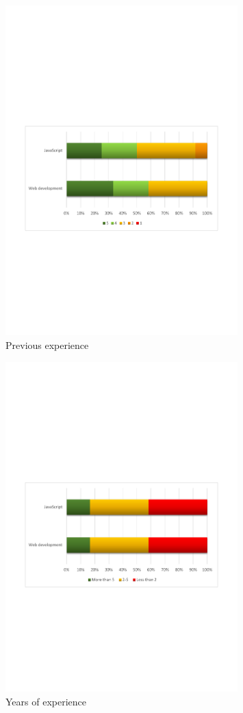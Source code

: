 \begin{figure}[H]
  \centering
    \includegraphics[width=0.8\textwidth]{images/charts/xp.pdf}
	\caption{Previous experience}
	\label{fig:xp}
\end{figure}

\begin{figure}[H]
  \centering
    \includegraphics[width=0.8\textwidth]{images/charts/years_of_xp.pdf}
	\caption{Years of experience}
	\label{fig:years_of_xp}
\end{figure}

